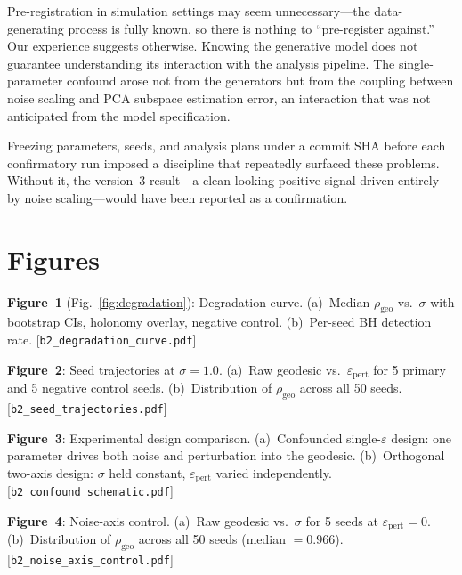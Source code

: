 \documentclass[11pt]{article}
\newcommand{\eps}{\varepsilon}
\newcommand{\epspert}{\eps_\mathrm{pert}}
\newcommand{\rhogeo}{\rho_\mathrm{geo}}
\begin{document}
Pre-registration in simulation settings may seem unnecessary---the
data-generating process is fully known, so there is nothing to
``pre-register against.''  Our experience suggests otherwise.
Knowing the generative model does not guarantee understanding its
interaction with the analysis pipeline.  The single-parameter
confound arose not from the generators but from the coupling
between noise scaling and PCA subspace estimation error, an
interaction that was not anticipated from the model specification.

Freezing parameters, seeds, and analysis plans under a commit SHA
before each confirmatory run imposed a discipline that repeatedly
surfaced these problems.  Without it, the version~3 result---a
clean-looking positive signal driven entirely by noise
scaling---would have been reported as a confirmation.

\section*{Figures}

\textbf{Figure~1} (Fig.~\ref{fig:degradation}): Degradation curve.
(a)~Median $\rhogeo$ vs.\ $\sigma$ with bootstrap CIs, holonomy
overlay, negative control.  (b)~Per-seed BH detection rate.
[\texttt{b2\_degradation\_curve.pdf}]

\textbf{Figure~2}: Seed trajectories at $\sigma = 1.0$.
(a)~Raw geodesic vs.\ $\epspert$ for 5 primary and 5 negative
control seeds.  (b)~Distribution of $\rhogeo$ across all 50 seeds.
[\texttt{b2\_seed\_trajectories.pdf}]

\textbf{Figure~3}: Experimental design comparison.
(a)~Confounded single-$\eps$ design: one parameter drives both
noise and perturbation into the geodesic.  (b)~Orthogonal two-axis
design: $\sigma$ held constant, $\epspert$ varied independently.
[\texttt{b2\_confound\_schematic.pdf}]

\textbf{Figure~4}: Noise-axis control.
(a)~Raw geodesic vs.\ $\sigma$ for 5 seeds at $\epspert = 0$.
(b)~Distribution of $\rhogeo$ across all 50 seeds (median $= 0.966$).
[\texttt{b2\_noise\_axis\_control.pdf}]

\label{fig:degradation}

% 
% 
\end{document}
